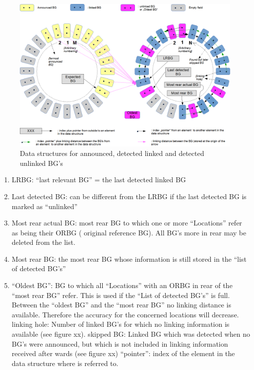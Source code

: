 \begin{figure}[ht]
\centering
\includegraphics[scale=0.4]{../images/DataStructure_Linking.png}
\caption{Data structures for announced,  detected linked and detected unlinked BG's}\label{fig:DataStructureLinking}
\end{figure}




\begin{enumerate}
\item LRBG: “last relevant BG” = the last detected linked BG
\item Last detected BG: can be different from the LRBG if the last detected BG is marked as “unlinked”
\item Most rear actual BG:  most rear BG to which one or more “Locations” refer as being their ORBG ( original reference BG). All BG's more in rear may be deleted from the list.
\item Most rear BG: the most rear BG whose information is still stored in the “list of detected BG's”
\item “Oldest BG”: BG to which all “Locations” with an ORBG in rear of the “most rear BG” refer. This is used if the “List of detected BG's” is full. Between the “oldest BG” and the “most rear BG” no linking distance is available. Therefore the accuracy for the concerned locations will decrease.
linking hole: Number of linked BG's for which no linking information is available (see figure xx).
skipped BG: Linked BG which was detected when no BG's were announced, but which is not included in linking information received after wards (see figure xx)
“pointer”:  index of the element in the data structure where is referred to.
\end{enumerate}

